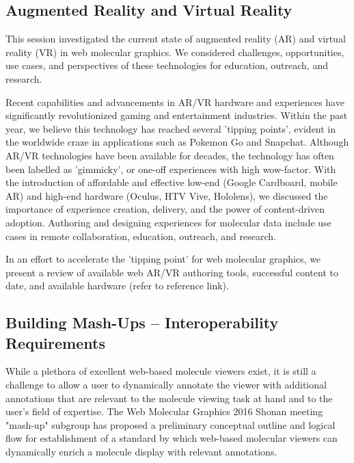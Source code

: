 \documentclass[a4paper]{article}
\begin{document}
\subsection{Augmented Reality and Virtual Reality}

This session investigated the current state of augmented reality (AR) and virtual reality (VR) in web molecular graphics. We considered challenges, opportunities, use cases, and perspectives of these technologies for education, outreach, and research. 

Recent capabilities and advancements in AR/VR hardware and experiences have significantly revolutionized gaming and entertainment industries. Within the past year, we believe this technology has reached several 'tipping points', evident in the worldwide craze in applications such as Pokemon Go and Snapchat. Although AR/VR technologies have been available for decades, the technology has often been labelled as 'gimmicky', or one-off experiences with high wow-factor. With the introduction of affordable and effective low-end (Google Cardboard, mobile AR) and high-end hardware (Oculus, HTV Vive, Hololens), we discussed the importance of experience creation, delivery, and the power of content-driven adoption. Authoring and designing experiences for molecular data include use cases in remote collaboration, education, outreach, and research. 

In an effort to accelerate the 'tipping point' for web molecular graphics, we present a review of available web AR/VR authoring tools, successful content to date, and available hardware (refer to reference link).

\subsection{Building Mash-Ups -- Interoperability Requirements}

While a plethora of excellent web-based molecule viewers exist, it is still a challenge to allow a user to dynamically annotate the viewer with additional annotations that are relevant to the molecule viewing task at hand and to the user's field of expertise. The Web Molecular Graphics 2016 Shonan meeting "mash-up" subgroup has proposed a preliminary conceptual outline and logical flow for establishment of a standard by which web-based molecular viewers can dynamically enrich a molecule display with relevant annotations.
\end{document}
